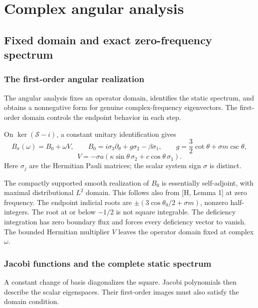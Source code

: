 \documentclass[11pt,a4paper]{article}
\begin{document}
\section{Complex angular analysis}\label{complex-angular-analysis}

\subsection{Fixed domain and exact zero-frequency
spectrum}\label{fixed-domain-and-exact-zero-frequency-spectrum}

\subsubsection{The first-order angular realization}\label{readable-angular-domain}

The angular analysis fixes an operator domain, identifies the static spectrum, and obtains a nonnegative form for genuine complex-frequency eigenvectors. The first-order domain controls the endpoint behavior in each step.

On \(\ker(\mathcal S-i)\), a constant unitary identification gives \[
 B_\sigma(\omega)=B_0+\omega V,\qquad
 B_0=i\sigma_3\partial_\theta+g\sigma_2-\beta\sigma_1,\qquad
 g=\frac32\cot\theta+\sigma m\csc\theta,
 \tag{9}
\] \[
 V=-\sigma a(\kappa\sin\theta\,\sigma_2+c\cos\theta\,\sigma_1).
\] Here \(\sigma_j\) are the Hermitian Pauli matrices; the scalar system
sign \(\sigma\) is distinct.

The compactly supported smooth realization of \(B_0\) is essentially
self-adjoint, with maximal distributional \(L^2\) domain. This follows
also from {[}H, Lemma 1{]} at zero frequency. The endpoint indicial
roots are \(\pm(3\cos\theta_0/2+\sigma m)\), nonzero half-integers. The
root at or below \(-1/2\) is not square integrable. The deficiency
integration has zero boundary flux and forces every deficiency vector to
vanish. The bounded Hermitian multiplier \(V\) leaves the operator
domain fixed at complex \(\omega\).

\subsubsection{Jacobi functions and the complete static spectrum}\label{readable-jacobi}

A constant change of basis diagonalizes the square. Jacobi polynomials then describe the scalar eigenspaces. Their first-order images must also satisfy the domain condition.
\end{document}
